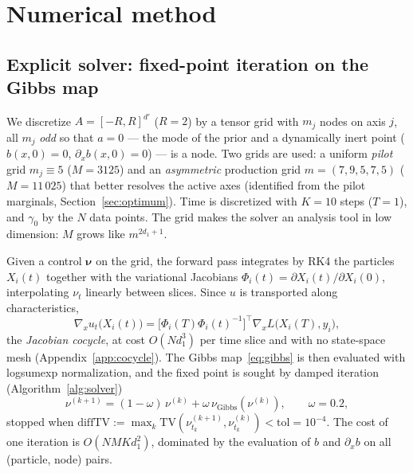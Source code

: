 \documentclass[11pt,leqno]{amsart}
\newcommand{\bnu}{\boldsymbol{\nu}}
\newcommand{\TV}{\mathrm{TV}}
\numberwithin{equation}{section}
\theoremstyle{definition}
\begin{document}
\section{Numerical method}
\label{sec:method}

\subsection{Explicit solver: fixed-point iteration on the Gibbs map}
\label{sec:method-solver}

We discretize $A=[-R,R]^{d'}$ ($R=2$) by a tensor grid with $m_j$ nodes on
axis $j$, all $m_j$ \emph{odd} so that $a=0$ --- the mode of the prior and a
dynamically inert point ($b(x,0)=0$, $\partial_xb(x,0)=0$) --- is a node.
Two grids are used: a uniform \emph{pilot} grid $m_j\equiv5$
($M=3125$) and an \emph{asymmetric} production grid
$m=(7,9,5,7,5)$ ($M=11\,025$) that better resolves the active axes
(identified from the pilot marginals, Section~\ref{sec:optimum}).
Time is discretized with $K=10$ steps ($T=1$), and $\gamma_0$ by the $N$
data points.  The grid makes the solver an analysis tool in low dimension:
$M$ grows like $m^{2d_1+1}$.

Given a control $\bnu$ on the grid, the forward pass integrates by RK4 the
particles $X_i(t)$ together with the variational Jacobians
$\Phi_i(t)=\partial X_i(t)/\partial X_i(0)$, interpolating $\nu_t$ linearly
between slices.  Since $u$ is transported along characteristics,
\begin{equation}
\label{eq:cocycle}
\nabla_x u_t\bigl(X_i(t)\bigr)
=\bigl[\Phi_i(T)\Phi_i(t)^{-1}\bigr]^{\!\top}\nabla_xL\bigl(X_i(T),y_i\bigr),
\end{equation}
the \emph{Jacobian cocycle}, at cost $O(Nd_1^3)$ per time slice and with no
state-space mesh (Appendix~\ref{app:cocycle}).  The Gibbs
map~\eqref{eq:gibbs} is then evaluated with logsumexp normalization, and the
fixed point is sought by damped iteration (Algorithm~\ref{alg:solver})
\begin{equation}
\label{eq:damped}
\nu^{(k+1)}=(1-\omega)\,\nu^{(k)}+\omega\,\nu_{\mathrm{Gibbs}}(\nu^{(k)}),
\qquad \omega=0.2,
\end{equation}
stopped when $\mathrm{diffTV}:=\max_k \TV(\nu^{(k+1)}_{t_k},
\nu^{(k)}_{t_k})<\mathrm{tol}=10^{-4}$.  The cost of one iteration is
$O(NMKd_1^2)$, dominated by the evaluation of $b$ and $\partial_xb$ on all
(particle, node) pairs.
\end{document}
